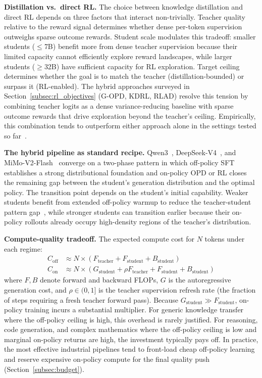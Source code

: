 \documentclass{article} %
\begin{document}
\textbf{Distillation vs.\ direct RL.} The choice between knowledge distillation and direct RL depends on three factors that interact non-trivially. Teacher quality relative to the reward signal determines whether dense per-token supervision outweighs sparse outcome rewards. Student scale modulates this tradeoff: smaller students ($\le$7B) benefit more from dense teacher supervision because their limited capacity cannot efficiently explore reward landscapes, while larger students ($\ge$32B) have sufficient capacity for RL exploration. Target ceiling determines whether the goal is to match the teacher (distillation-bounded) or surpass it (RL-enabled). The hybrid approaches surveyed in Section~\ref{subsec:rl_objectives} (G-OPD, KDRL, RLAD) resolve this tension by combining teacher logits as a dense variance-reducing baseline with sparse outcome rewards that drive exploration beyond the teacher's ceiling. Empirically, this combination tends to outperform either approach alone in the settings tested so far~\citep{2602.12125,2506.02208,2602.22495}.

\textbf{The hybrid pipeline as standard recipe.} Qwen3~\citep{2505.09388}, DeepSeek-V4~\citep{deepseekv4}, and MiMo-V2-Flash~\citep{2601.02780} converge on a two-phase pattern in which off-policy SFT establishes a strong distributional foundation and on-policy OPD or RL closes the remaining gap between the student's generation distribution and the optimal policy. The transition point depends on the student's initial capability. Weaker students benefit from extended off-policy warmup to reduce the teacher-student pattern gap~\citep{2604.13016}, while stronger students can transition earlier because their on-policy rollouts already occupy high-density regions of the teacher's distribution.

\textbf{Compute-quality tradeoff.} The expected compute cost for $N$ tokens under each regime:
\begin{align}
    C_{\text{off}} &\approx N \times (F_{\text{teacher}} + F_{\text{student}} + B_{\text{student}}) \\
    C_{\text{on}} &\approx N \times \left( G_{\text{student}} + \rho F_{\text{teacher}} + F_{\text{student}} + B_{\text{student}} \right)
\end{align}
where $F, B$ denote forward and backward FLOPs, $G$ is the autoregressive generation cost, and $\rho \in (0, 1]$ is the teacher supervision refresh rate (the fraction of steps requiring a fresh teacher forward pass). Because $G_{\text{student}} \gg F_{\text{student}}$, on-policy training incurs a substantial multiplier. For generic knowledge transfer where the off-policy ceiling is high, this overhead is rarely justified. For reasoning, code generation, and complex mathematics where the off-policy ceiling is low and marginal on-policy returns are high, the investment typically pays off. In practice, the most effective industrial pipelines tend to front-load cheap off-policy learning and reserve expensive on-policy compute for the final quality push (Section~\ref{subsec:budget}).
\end{document}
